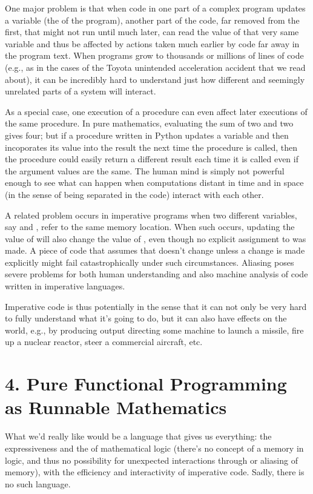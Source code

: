 \documentclass[letterpaper,10pt,english]{sphinxmanual}
\begin{document}
One major problem is that when code in one part of a complex program
updates a variable (the  of the program), another part of the
code, far removed from the first, that might not run until much later,
can read the value of that very same variable and thus be affected by
actions taken much earlier by code far away in the program text. When
programs grow to thousands or millions of lines of code (e.g., as in
the cases of the Toyota unintended acceleration accident that we read
about), it can be incredibly hard to understand just how different and
seemingly unrelated parts of a system will interact.

As a special case, one execution of a procedure can even affect later
executions of the same procedure. In pure mathematics, evaluating the
sum of two and two  gives four; but if a procedure written in
Python updates a  variable and then incoporates its value into
the result the next time the procedure is called, then the procedure
could easily return a different result each time it is called even if
the argument values are the same. The human mind is simply not powerful
enough to see what can happen when computations distant in time and in
space (in the sense of being separated in the code) interact with each
other.

A related problem occurs in imperative programs when two different
variables, say  and , refer to the same memory location. When
such  occurs, updating the value of  will also change the
value of , even though no explicit assignment to  was made. A
piece of code that assumes that  doesn’t change unless a change is
made explicitly might fail catastrophically under such circumstances.
Aliasing poses severe problems for both human understanding and also
machine analysis of code written in imperative languages.

Imperative code is thus potentially  in the sense that it can
not only be very hard to fully understand what it’s going to do, but
it can also have effects on the world, e.g., by producing output
directing some machine to launch a missile, fire up a nuclear reactor,
steer a commercial aircraft, etc.


\chapter{4. Pure Functional Programming as Runnable Mathematics}
\label{\detokenize{04-runnable-math::doc}}\label{\detokenize{04-runnable-math:pure-functional-programming-as-runnable-mathematics}}
What we’d really like would be a language that gives us everything:
the expressiveness and the  of mathematical logic (there’s no
concept of a memory in logic, and thus no possibility for unexpected
interactions through or aliasing of memory), with the efficiency and
interactivity of imperative code. Sadly, there is no such language.
\end{document}
